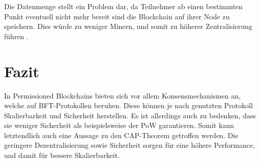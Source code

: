 Die Datenmenge stellt ein Problem dar, da Teilnehmer ab einen bestimmten Punkt eventuell nicht mehr bereit sind die Blockchain auf ihrer Node zu speichern. Dies würde zu weniger Minern, und somit zu höherer Zentralisierung führen \cite{SchererPerformanceScalabilityBlockchain2017}.

\section{Fazit}
In Permissioned Blockchains bieten sich vor allem Konsensmechanismen an, welche auf BFT-Protokollen beruhen. Diese können je nach genutzten Protokoll Skalierbarkeit und Sicherheit herstellen. Es ist allerdings auch zu bedenken, dass sie weniger Sicherheit als beispielsweise der PoW garantieren. Somit kann letztendlich auch eine Aussage zu den CAP-Theorem getroffen werden. Die geringere Dezentralisierung sowie Sicherheit sorgen für eine höhere Performance, und damit für bessere Skalierbarkeit.





